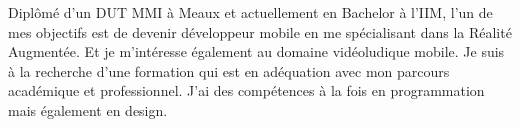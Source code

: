 

\begin{cvparagraph}

Diplômé d'un DUT MMI à Meaux et actuellement en Bachelor à l'IIM, l'un de mes objectifs est de devenir développeur mobile en me spécialisant dans la Réalité Augmentée. Et je m'intéresse également au domaine vidéoludique mobile. Je suis à la recherche d'une formation qui est en adéquation avec mon parcours académique et professionnel. J'ai des compétences à la fois en programmation mais également en design.
\end{cvparagraph}